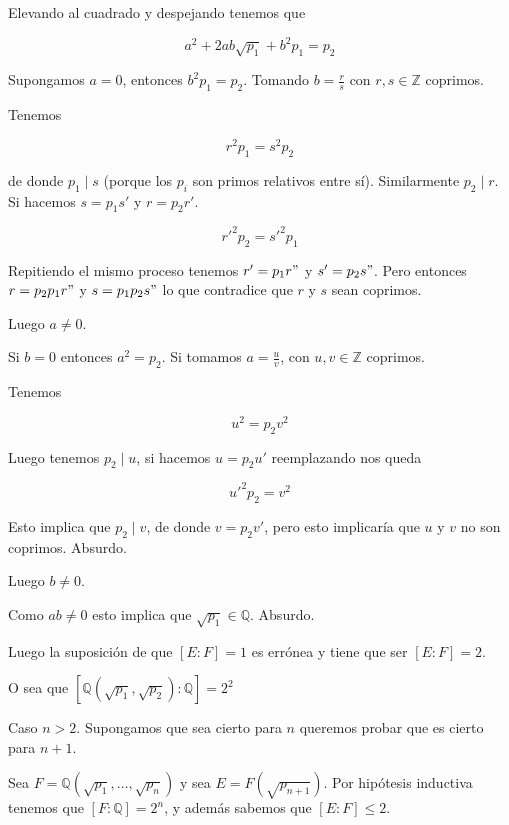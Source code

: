 \documentclass{article}
\def\Q{\mathbb{Q}}
\def\Z{\mathbb{Z}}
\begin{document}
Elevando al cuadrado y despejando tenemos que 

\[ a^2 + 2ab \sqrt{p_1} + b^2 p_1 = p_2 \]

Supongamos $a=0$, entonces $b^2 p_1 = p_2$. Tomando $b = \frac{r}{s}$ 
con $r,s \in \Z$ coprimos.

Tenemos 

\[ r^2 p_1 = s^2 p_2 \]

de donde $p_1 \mid s$ (porque los $p_i$ son primos relativos entre sí). 
Similarmente $p_2 \mid r$. Si hacemos $s = p_1 s'$ y $r = p_2 r'$.

\[ r'^2 p_2 = s'^2 p_1 \]

Repitiendo el mismo proceso tenemos $r' = p_1 r"$ y $s' = p_2 s"$.
Pero entonces $r = p_2 p_1 r"$ y $s = p_1 p_2 s"$ lo que contradice
que $r$ y $s$ sean coprimos.

Luego $a \ne 0$.

Si $b = 0$ entonces $a^2 = p_2$. Si tomamos $a = \frac{u}{v}$, con 
$u, v \in \Z$ coprimos.

Tenemos 

\[ u^2 = p_2 v^2 \]

Luego tenemos $p_2 \mid u$, si hacemos $u = p_2 u'$ reemplazando
nos queda

\[ u'^2 p_2 = v^2 \]

Esto implica que $p_2 \mid v$, de donde $v = p_2 v'$, pero esto
implicaría que $u$ y $v$ no son coprimos. Absurdo.

Luego $b \ne 0$.

Como $ab \ne 0$ esto implica que $\sqrt{p_1} \in \Q$.
Absurdo.

Luego la suposición de que $[E:F] = 1$ es errónea y tiene
que ser $[E:F] = 2$.

O sea que $[\Q(\sqrt{p_1}, \sqrt{p_2}):\Q] = 2^2$

Caso $n > 2$. Supongamos que sea cierto para $n$ queremos probar que
es cierto para $n + 1$.

Sea $F = \Q(\sqrt{p_1},\dots,\sqrt{p_n})$ y sea $E = F(\sqrt{p_{n+1}})$.
Por hipótesis inductiva tenemos que $[F:\Q] = 2^n$, y además
sabemos que $[E:F] \le 2$.
\end{document}

